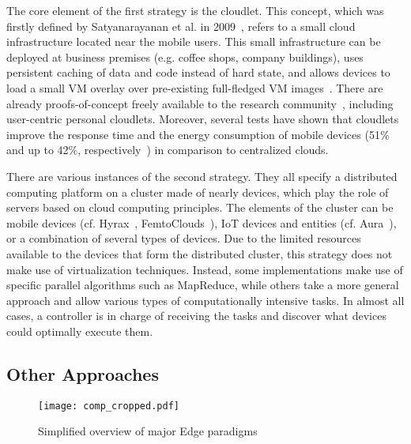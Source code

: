 \documentclass[twocolumn,preprint,3p]{elsarticle}
\begin{document}
The core element of the first strategy is the cloudlet. This concept, which was firstly defined by Satyanarayanan et al. in 2009~\cite{Satyanarayanan09}, refers to a small cloud infrastructure located near the mobile users. This small infrastructure can be deployed at business premises (e.g. coffee shops, company buildings), uses persistent caching of data and code instead of hard state, and allows devices to load a small VM overlay over pre-existing full-fledged VM images~\cite{Satyanarayanan15}. There are already proofs-of-concept freely available to the research community~\cite{Elijah15}, including user-centric personal cloudlets. Moreover, several tests have shown that cloudlets improve the response time and the energy consumption of mobile devices (51\% and up to 42\%, respectively~\cite{GaoCloudlet15}) in comparison to centralized clouds.

There are various instances of the second strategy. They all specify a distributed computing platform on a cluster made of nearly devices, which play the role of servers based on cloud computing principles. The elements of the cluster can be mobile devices (cf. Hyrax~\cite{Marinelli09}, FemtoClouds~\cite{Habak15}), IoT devices and entities (cf. Aura~\cite{Aura15}), or a combination of several types of devices. Due to the limited resources available to the devices that form the distributed cluster, this strategy does not make use of virtualization techniques. Instead, some implementations make use of specific parallel algorithms such as MapReduce, while others take a more general approach and allow various types of computationally intensive tasks. In almost all cases, a controller is in charge of receiving the tasks and discover what devices could optimally execute them.



\subsection{Other Approaches}
\label{overview:other}

\begin{figure*}
\centering
\texttt{[image: comp\_cropped.pdf]}
\caption{Simplified overview of major Edge paradigms}
\label{fig:Comp}
\end{figure*}
\end{document}
